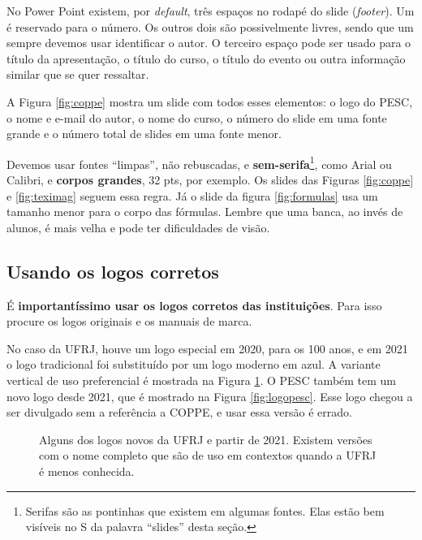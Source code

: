 No Power Point existem, por \textit{default}, três espaços no rodapé do slide (\textit{footer}).
Um é reservado para o número.
 Os outros dois são possivelmente livres, sendo que um  sempre devemos usar identificar o autor.
 O terceiro espaço pode ser usado para o título da apresentação, o título do curso, o título do evento ou outra informação similar que se quer ressaltar.

A Figura \ref{fig:coppe} mostra um slide com todos esses elementos: o logo do PESC, o nome e e-mail do autor, o nome do curso, o número do slide em uma fonte grande e o número total de slides em uma fonte menor.


Devemos usar fontes ``limpas'', não rebuscadas, e \textbf{sem-serifa}\footnote{Serifas são as pontinhas que existem em algumas fontes.
Elas estão bem visíveis no S da palavra ``slides'' desta seção.}, como Arial ou Calibri, e \textbf{corpos grandes}, 32 pts, por exemplo.
Os slides das Figuras \ref{fig:coppe} e \ref{fig:teximag} seguem essa regra. Já o slide da figura \ref{fig:formulas} usa um tamanho menor para o corpo das fórmulas.
Lembre que uma banca, ao invés de alunos, é mais velha e pode ter dificuldades de visão.





\subsection{Usando os logos corretos}

É \textbf{importantíssimo usar os logos corretos das instituições}. Para isso procure os logos originais e os manuais de marca.

No caso da UFRJ, houve um logo especial em 2020, para os 100 anos, e em 2021 o logo tradicional foi substituído por um logo moderno em azul. A variante vertical de uso preferencial é mostrada na Figura \ref{fig:logoufrj}. O PESC também tem um novo logo desde 2021, que é mostrado na Figura \ref{fig:logopesc}. Esse logo chegou a ser divulgado sem a referência a COPPE, e usar essa versão é errado.

\begin{figure}[hbt]
    \centering
    \caption{Alguns dos logos novos da  UFRJ e partir de 2021. Existem versões com o nome completo que são de uso em contextos quando a UFRJ é menos conhecida.}
    \label{fig:logoufrj}
\end{figure}

